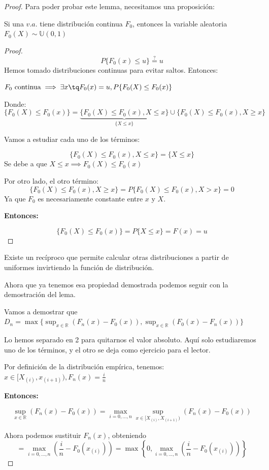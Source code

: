 \begin{proof}
Para poder probar este lemma, necesitamos una proposición:

\begin{prop}
Si una $v.a.$ tiene distribución continua $F_0$, entonces la variable aleatoria $F_0(X)\sim \mathbb{U}(0,1)$\label{prop::funcionsobredistribucioncontinua}
\end{prop}
\begin{proof}
\[
P\{F_0(x) \leq u\} \overset{?}{=} u 
\]
Hemos tomado distribuciones continuas para evitar saltos. Entonces:

$F_0 \text{ continua} \implies \exists x \tq F_0(x) = u, P\{F_0(X)\leq F_0(x)\}$

Donde:
\[
\{F_0(X)\leq F_0(x)\} = \underbrace{\{F_0(X)\leq F_0(x), X\leq x\}}_{\{X\leq x\}} \cup \{F_0(X)\leq F_0(x), X\ge x\}
\]

Vamos a estudiar cada uno de los términos:

\[\{F_0(X)\leq F_0(x), X\leq x\} = \{X\leq x\}\]
Se debe a que $X\leq x \implies F_0(X)\leq F_0(x)$

Por otro lado, el otro término:
\[\{F_0(X)\leq F_0(x), X\ge x\} = P\{F_0(X)\leq F_0(x), X>x\} = 0\]
Ya que $F_0$ es necesariamente constante entre $x$ y $X$.


\textbf{Entonces:}

\[
\{F_0(X)\leq F_0(x)\} = P\{X\leq x\} = F(x) = u
\]
\end{proof}
\obs Existe un recíproco que permite calcular otras distribuciones a partir de uniformes invirtiendo la función de distribución.


Ahora que ya tenemos esa propiedad demostrada podemos seguir con la demostración del lema.

Vamos a demostrar que $D_n = \max\{\sup_{x\in ℝ} (F_n(x) - F_0(x)),\sup_{x\in ℝ} (F_0(x) - F_n(x)) \}$

Lo hemos separado en 2 para quitarnos el valor absoluto. Aquí solo estudiaremos uno de los términos, y el otro se deja como ejercicio para el lector.

Por definición de la distribución empírica, tenemos: $x\in [X_{(i)},x_{(i+1)}), F_n(x) = \frac{i}{n}$

\textbf{Entonces:}

\[
\sup_{x\in ℝ} (F_n(x) - F_0(x)) = \max_{i=0,...,n} \sup_{x\in [X_{(i)},X_{(i+1)})} (F_n(x) - F_0(x))
\]


Ahora podemos sustituir $F_n(x)$, obteniendo
\[
 = \max_{i=0,...,n} \left( \frac{i}{n} - F_0(x_{(i)})\right) = \max \left\{0,\max_{i=0,...,n} \left( \frac{i}{n} - F_0(x_{(i)})\right)\right\}
\]


\end{proof}
